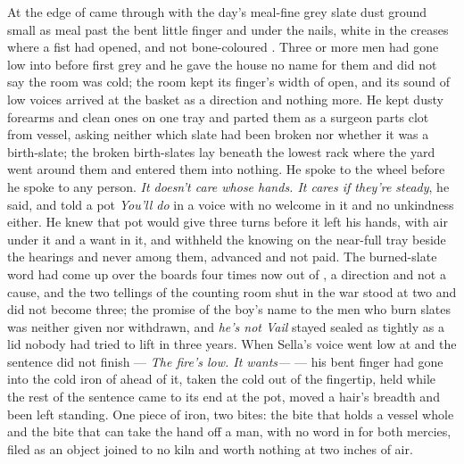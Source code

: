 At the edge of   came through with the day's meal-fine grey slate dust ground small as meal past the bent little finger and under the nails, white in the creases where a fist had opened, and not bone-coloured . Three or more men had gone low into  before first grey and he gave the house no name for them and did not say the room was cold; the room kept its finger's width of open, and its sound of low voices arrived at the basket as a direction and nothing more. He kept dusty forearms and clean ones on one tray and parted them as a surgeon parts clot from vessel, asking neither which slate had been broken nor whether it was a birth-slate; the broken birth-slates lay beneath the lowest rack where the yard went around them and entered them into nothing. He spoke to the wheel before he spoke to any person. \emph{It doesn't care whose hands. It cares if they're steady}, he said, and told a pot \emph{You'll do} in a voice with no welcome in it and no unkindness either. He knew  that pot would give three turns before it left his hands, with air under it and a want in it, and withheld the knowing on the near-full tray beside the hearings and never among them, advanced and not paid. The burned-slate word had come up over the boards four times now out of , a direction and not a cause, and the two tellings of the counting room shut in the war stood at two and did not become three; the promise of the boy's name to the men who burn slates was neither given nor withdrawn, and \emph{he's not Vail} stayed sealed as tightly as a lid nobody had tried to lift in three years. When Sella's voice went low at  and the sentence did not finish --- \emph{The fire's low. It wants---} --- his bent finger had gone into the cold iron of  ahead of it, taken the cold out of the fingertip, held while the rest of the sentence came to its end at the pot, moved a hair's breadth and been left standing. One piece of iron, two bites: the bite that holds a vessel whole and the bite that can take the hand off a man, with no word in  for both mercies, filed as an object joined to no kiln and worth nothing at two inches of air.

\scenebreak


